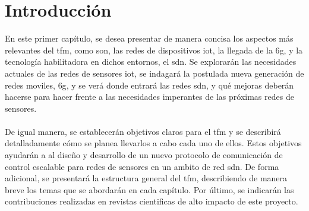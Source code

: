 
\chapter{Introducción}
\label{ch:intro}

\par
En este primer capítulo, se desea presentar de manera concisa los aspectos más relevantes del \gls{tfm}, como son, las redes de dispositivos \gls{iot}, la llegada de la \gls{6g}, y la tecnología habilitadora en dichos entornos, el \gls{sdn}. Se explorarán las necesidades actuales de las redes de sensores \gls{iot}, se indagará la postulada nueva generación de redes moviles, \gls{6g}, y se verá donde entrará las redes \gls{sdn}, y qué mejoras deberán hacerse para hacer frente a las necesidades imperantes de las próximas redes de sensores.\\
\\
De igual manera, se establecerán objetivos claros para el \gls{tfm} y se describirá detalladamente cómo se planea llevarlos a cabo cada uno de ellos. Estos objetivos ayudarán a al diseño y desarrollo de un nuevo protocolo de comunicación de control escalable para redes de sensores en un ambito de red \gls{sdn}. De forma adicional, se presentará la estructura general del \gls{tfm}, describiendo de manera breve los temas que se abordarán en cada capítulo. Por último, se indicarán las contribuciones realizadas en revistas cientificas de alto impacto de este proyecto.

